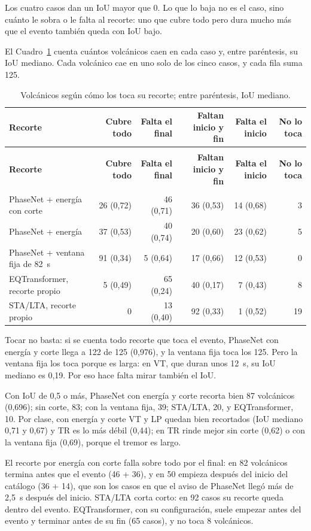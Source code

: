 \documentclass[11pt,a4paper,oneside,spanish,oldfontcommands]{memoir}
\newcommand{\cabecera}[2]{%
  \toprule #1 \\ \midrule \endfirsthead
  \multicolumn{#2}{l}{\itshape Cuadro \thetable{} (continuación)}\\
  \toprule #1 \\ \midrule \endhead
  \midrule \multicolumn{#2}{r}{\itshape Continúa en la página siguiente}\\ \endfoot
  \bottomrule \endlastfoot}
\begin{document}
Los cuatro casos dan un IoU mayor que 0. Lo que lo baja no es el caso, sino
cuánto le sobra o le falta al recorte: uno que cubre todo pero dura mucho más
que el evento también queda con IoU bajo.

El Cuadro~\ref{tab:iou-casos} cuenta cuántos volcánicos caen en cada caso y,
entre paréntesis, su IoU mediano. Cada volcánico cae en uno solo de los cinco
casos, y cada fila suma 125.

{\small
\setlength{\tabcolsep}{3pt}
\begin{longtable}{>{\raggedright\arraybackslash}p{4.3cm}rrrrr}
\caption{Volcánicos según cómo los toca su recorte; entre paréntesis, IoU mediano.}\label{tab:iou-casos}\\
\cabecera{\textbf{Recorte} & \textbf{Cubre todo} & \textbf{Falta el final} & \textbf{Faltan inicio y fin} & \textbf{Falta el inicio} & \textbf{No lo toca}}{6}
PhaseNet + energía con corte & 26 (0,72) & 46 (0,71) & 36 (0,53) & 14 (0,68) & 3 \\
PhaseNet + energía & 37 (0,53) & 40 (0,74) & 20 (0,60) & 23 (0,62) & 5 \\
PhaseNet + ventana fija de 82~s & 91 (0,34) & 5 (0,64) & 17 (0,66) & 12 (0,53) & 0 \\
EQTransformer, recorte propio & 5 (0,49) & 65 (0,24) & 40 (0,17) & 7 (0,43) & 8 \\
STA/LTA, recorte propio & 0 & 13 (0,40) & 92 (0,33) & 1 (0,52) & 19 \\
\end{longtable}
}

Tocar no basta: si se cuenta todo recorte que toca el evento, PhaseNet con
energía y corte llega a 122 de 125 (0,976), y la ventana fija toca los 125. Pero
la ventana fija los toca porque es larga: en VT, que duran unos 12~s, su IoU
mediano es 0,19. Por eso hace falta mirar también el IoU.

Con IoU de 0,5 o más, PhaseNet con energía y corte recorta bien 87 volcánicos
(0,696); sin corte, 83; con la ventana fija, 39; STA/LTA, 20, y EQTransformer,
10. Por clase, con energía y corte VT y LP quedan bien recortados (IoU mediano
0,71 y 0,67) y TR es lo más débil (0,44); en TR rinde mejor sin corte (0,62) o
con la ventana fija (0,69), porque el tremor es largo.

El recorte por energía con corte falla sobre todo por el final: en 82
volcánicos termina antes que el evento (46 + 36), y en 50 empieza después del
inicio del catálogo (36 + 14), que son los casos en que el aviso de PhaseNet
llegó más de 2,5~s después del inicio. STA/LTA corta corto: en 92 casos su
recorte queda dentro del evento. EQTransformer, con su configuración, suele
empezar antes del evento y terminar antes de su fin (65 casos), y no toca 8
volcánicos.
\end{document}
